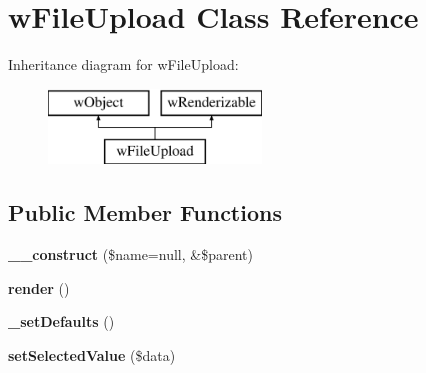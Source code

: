 \hypertarget{classwFileUpload}{
\section{wFileUpload Class Reference}
\label{classwFileUpload}
}
Inheritance diagram for wFileUpload:\begin{figure}[H]
\begin{center}
\leavevmode
\includegraphics[height=2.000000cm]{classwFileUpload}
\end{center}
\end{figure}
\subsection*{Public Member Functions}
\begin{DoxyCompactItemize}
\item 
\hypertarget{classwFileUpload_a0b9a0b67426fead321433a82bebca839}{
{\bfseries \_\-\_\-construct} (\$name=null, \&\$parent)}
\label{classwFileUpload_a0b9a0b67426fead321433a82bebca839}

\item 
\hypertarget{classwFileUpload_a823542516049056a7c6b3d41d5692362}{
{\bfseries render} ()}
\label{classwFileUpload_a823542516049056a7c6b3d41d5692362}

\item 
\hypertarget{classwFileUpload_a0bba5d5dda74c9c2c337a50efab36bc7}{
{\bfseries \_\-setDefaults} ()}
\label{classwFileUpload_a0bba5d5dda74c9c2c337a50efab36bc7}

\item 
\hypertarget{classwFileUpload_a67492ce12aebdbaf10c04326640dcce3}{
{\bfseries setSelectedValue} (\$data)}
\label{classwFileUpload_a67492ce12aebdbaf10c04326640dcce3}

\end{DoxyCompactItemize}
